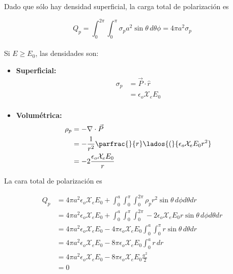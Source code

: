 Dado que sólo hay densidad superficial, la carga total de polarización es

\[Q_p = \int^{2\pi}_0\int^\pi_0\sigma_p a^2\sin{\theta}\,d\theta\phi = 4\pi a^2\sigma_p\]\\

Si $E\geq E_0$, las densidades son:

\begin{itemize}
    \item \textbf{Superficial:}
    \begin{equation}
    \begin{split}
        \sigma_p &= \Vec{P}\cdot\hat{r}\\
        &= \epsilon_o\mathcal{X}_e E_0\\
    \end{split}
    \nonumber
    \end{equation}
    \item \textbf{Volumétrica:}
    \begin{equation}
    \begin{split}
        \rho_p &= -\nabla\cdot\Vec{P}\\
        &= -\frac{1}{r^2}\parfrac{}{r}\lados{(}{\epsilon_o\mathcal{X}_eE_0r^2}\\
        &= -2\frac{\epsilon_o\mathcal{X}_eE_0}{r}\\
    \end{split}
    \nonumber
    \end{equation}
\end{itemize}

La cara total de polarización es

\begin{equation}
\begin{split}
    Q_p&=4\pi a^2\epsilon_o\mathcal{X}_eE_0+\int^{a}_0\int^{\pi}_0\int^{2\pi}_0\rho_pr^2\sin{\theta}\,d\phi d\theta dr\\
    &=4\pi a^2\epsilon_o\mathcal{X}_eE_0+\int^{a}_0\int^{\pi}_0\int^{2\pi}_0-2\epsilon_o\mathcal{X}_eE_0r\sin{\theta}\,d\phi d\theta dr\\
    &=4\pi a^2\epsilon_o\mathcal{X}_eE_0-4\pi\epsilon_o\mathcal{X}_eE_0\int^{a}_0\int^{\pi}_0r\sin{\theta}\,d\theta dr\\
    &=4\pi a^2\epsilon_o\mathcal{X}_eE_0-8\pi\epsilon_o\mathcal{X}_eE_0\int^{a}_0r\,dr\\
    &=4\pi a^2\epsilon_o\mathcal{X}_eE_0-8\pi\epsilon_o\mathcal{X}_eE_0\frac{a^2}{2}\\
    &=0\\
\end{split}
\nonumber
\end{equation}

